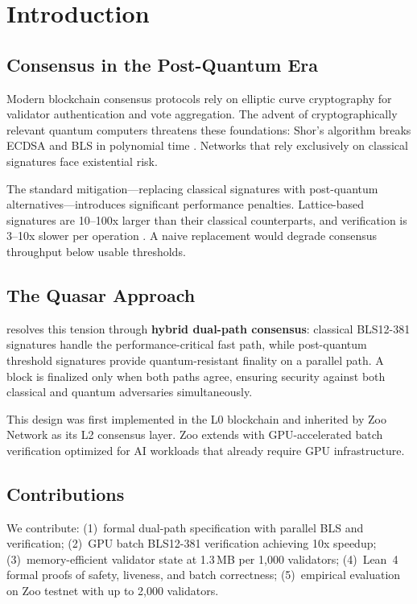 \section{Introduction}


\subsection{Consensus in the Post-Quantum Era}

Modern blockchain consensus protocols rely on elliptic curve cryptography for validator authentication and vote aggregation. The advent of cryptographically relevant quantum computers threatens these foundations: Shor's algorithm breaks ECDSA and BLS in polynomial time \cite{shor1997polynomial}. Networks that rely exclusively on classical signatures face existential risk.

The standard mitigation---replacing classical signatures with post-quantum alternatives---introduces significant performance penalties. Lattice-based signatures are 10--100x larger than their classical counterparts, and verification is 3--10x slower per operation \cite{nist2024pqc}. A naive replacement would degrade consensus throughput below usable thresholds.

\subsection{The Quasar Approach}

\Quasar{} resolves this tension through \textbf{hybrid dual-path consensus}: classical BLS12-381 signatures handle the performance-critical fast path, while \Corona{} post-quantum threshold signatures provide quantum-resistant finality on a parallel path. A block is finalized only when both paths agree, ensuring security against both classical and quantum adversaries simultaneously.

This design was first implemented in the \Lux{} L0 blockchain \cite{lux-quasar-consensus} and inherited by Zoo Network as its L2 consensus layer. Zoo extends \Quasar{} with GPU-accelerated batch verification optimized for AI workloads that already require GPU infrastructure.

\subsection{Contributions}

We contribute: (1)~formal \Quasar{} dual-path specification with parallel BLS and \Corona{} verification; (2)~GPU batch BLS12-381 verification achieving 10x speedup; (3)~memory-efficient validator state at 1.3\,MB per 1,000 validators; (4)~Lean~4 formal proofs of safety, liveness, and batch correctness; (5)~empirical evaluation on Zoo testnet with up to 2,000 validators.

